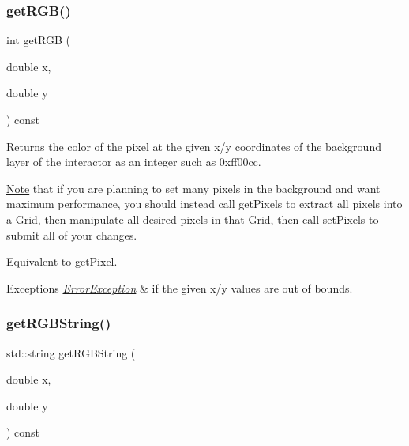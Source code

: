 \subsubsection{\texorpdfstring{get\+R\+G\+B()}{getRGB()}}
{\footnotesize\ttfamily int get\+R\+GB (\begin{DoxyParamCaption}\item[{double}]{x,  }\item[{double}]{y }\end{DoxyParamCaption}) const\hspace{0.3cm}{\ttfamily [virtual]}}



Returns the color of the pixel at the given x/y coordinates of the background layer of the interactor as an integer such as 0xff00cc. 

\mbox{\hyperlink{classNote}{Note}} that if you are planning to set many pixels in the background and want maximum performance, you should instead call get\+Pixels to extract all pixels into a \mbox{\hyperlink{classGrid}{Grid}}, then manipulate all desired pixels in that \mbox{\hyperlink{classGrid}{Grid}}, then call set\+Pixels to submit all of your changes.

Equivalent to get\+Pixel.


\begin{DoxyExceptions}{Exceptions}
{\em \mbox{\hyperlink{classErrorException}{Error\+Exception}}} & if the given x/y values are out of bounds. \\
\hline
\end{DoxyExceptions}
\mbox{\label{classGDrawingSurface_a456d3582acc3544f37d939f5cb8802fe}} 
\subsubsection{\texorpdfstring{get\+R\+G\+B\+String()}{getRGBString()}}
{\footnotesize\ttfamily std\+::string get\+R\+G\+B\+String (\begin{DoxyParamCaption}\item[{double}]{x,  }\item[{double}]{y }\end{DoxyParamCaption}) const\hspace{0.3cm}{\ttfamily [virtual]}}



